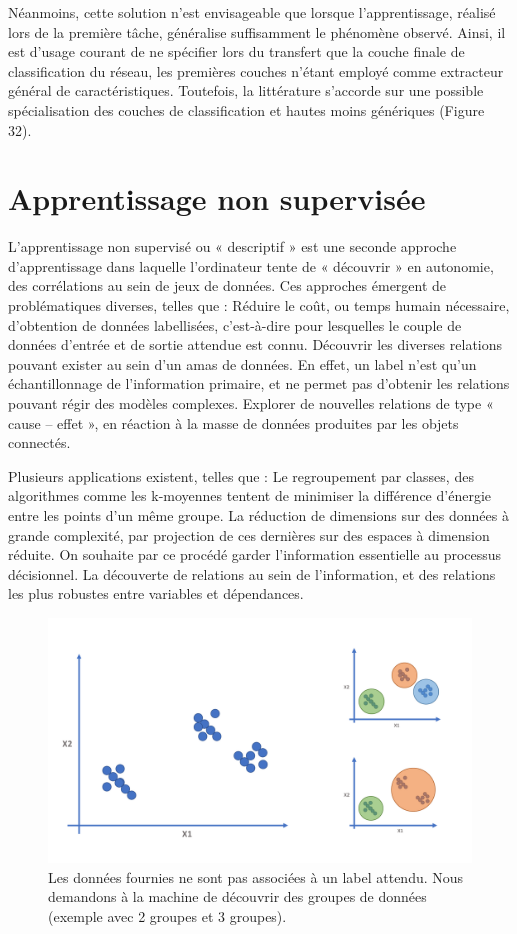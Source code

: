 Néanmoins, cette solution n’est envisageable que lorsque l’apprentissage, réalisé lors de la première tâche, généralise suffisamment le phénomène observé. Ainsi, il est d’usage courant de ne spécifier lors du transfert que la couche finale de classification du réseau, les premières couches n’étant employé comme extracteur général de caractéristiques. Toutefois, la littérature s’accorde sur une possible spécialisation des couches de classification et hautes moins génériques (Figure 32).
   

\section{Apprentissage non supervisée}
L’apprentissage non supervisé ou « descriptif » est une seconde approche d’apprentissage dans laquelle l’ordinateur tente de « découvrir » en autonomie, des corrélations au sein de jeux de données. Ces approches émergent de problématiques diverses, telles que :
	Réduire le coût, ou temps humain nécessaire, d’obtention de données labellisées, c’est-à-dire pour lesquelles le couple de données d’entrée et de sortie attendue est connu.
	Découvrir les diverses relations pouvant exister au sein d’un amas de données. En effet, un label n’est qu’un échantillonnage de l’information primaire, et ne permet pas d’obtenir les relations pouvant régir des modèles complexes.
	Explorer de nouvelles relations de type « cause – effet », en réaction à la masse de données produites par les objets connectés. 

Plusieurs applications existent, telles que :
	Le regroupement par classes, des algorithmes comme les k-moyennes tentent de minimiser la différence d’énergie entre les points d’un même groupe.
	La réduction de dimensions sur des données à grande complexité, par projection de ces dernières sur des espaces à dimension réduite. On souhaite par ce procédé garder l’information essentielle au processus décisionnel.
	La découverte de relations au sein de l’information, et des relations les plus robustes entre variables et dépendances.
 
\begin{figure}[H]
    \centering
    \includegraphics[width=\linewidth]{contents/chapter_3/resources/Unsupervised.pdf}
    \caption{Les données fournies ne sont pas associées à un label attendu. Nous demandons à la machine de découvrir des groupes de données (exemple avec 2 groupes et 3 groupes).}
    \label{fig:chapter_3:unsupervised}
\end{figure}

